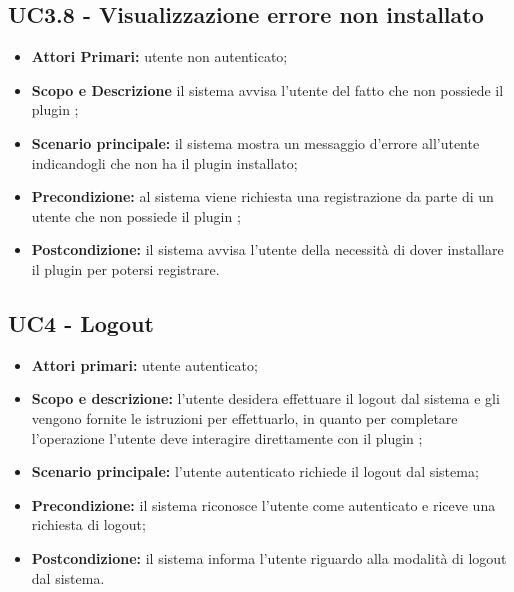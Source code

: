 \documentclass[AnalisiDeiRequisiti.tex]{subfiles}
\begin{document}
\subsection{UC3.8 - Visualizzazione errore  non installato}
\begin{itemize}
	\item \textbf{Attori Primari:} utente non autenticato;
	\item \textbf{Scopo e Descrizione} il sistema avvisa l'utente del fatto che non possiede il plugin ;
	\item \textbf{Scenario principale:} il sistema mostra un messaggio d'errore all'utente indicandogli che non ha il plugin  installato;
	\item \textbf{Precondizione:} al sistema viene richiesta una registrazione da parte di un utente che non possiede il plugin ;
	\item \textbf{Postcondizione:} il sistema avvisa l'utente della necessità di dover installare il plugin  per potersi registrare.
\end{itemize}
\subsection{UC4 - Logout}
\begin{itemize}
	\item \textbf{Attori primari:} utente autenticato;
	\item \textbf{Scopo e descrizione:} l'utente desidera effettuare il logout dal sistema e gli vengono fornite le istruzioni per effettuarlo, in quanto per completare l'operazione l'utente deve interagire direttamente con il plugin ;
	\item \textbf{Scenario principale:} l'utente autenticato richiede il logout dal sistema;
	\item \textbf{Precondizione:} il sistema riconosce l'utente come autenticato e riceve una richiesta di logout;
	\item \textbf{Postcondizione:} il sistema informa l'utente riguardo alla modalità di logout dal sistema.
\end{itemize}
\end{document}
